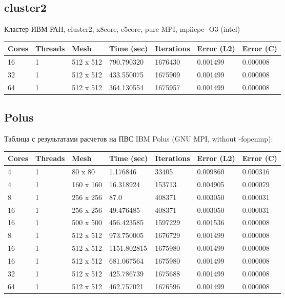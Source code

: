 \documentclass[12pt]{article}
\begin{document}
\subsection{cluster2}

Кластер ИВМ РАН, cluster2, x8core, e5core, pure MPI, mpiicpc -O3 (intel)
\begin{center}
\begin{tabular}{lllllll}
Cores & Threads & Mesh & Time (sec) & Iterations & Error (L2) & Error (C) \\
\hline
16 & 1 & 512 x 512 & 790.790320 & 1676430 & 0.001499 & 0.000008 \\
32 & 1 & 512 x 512 & 433.550075 & 1675909 & 0.001499 & 0.000008 \\
64 & 1 & 512 x 512 & 364.130554 & 1675957 & 0.001499 & 0.000008 \\
\hline
\hline
\end{tabular}
\end{center}

\subsection{Polus}

Таблица с результатами расчетов на ПВС IBM Polus (GNU MPI, without -fopenmp):
\begin{center}
\begin{tabular}{lllllll}
Cores & Threads & Mesh & Time (sec) & Iterations & Error (L2) & Error (C) \\
\hline
4 & 1 & 80 x 80 & 1.176846 & 33405 & 0.009860 & 0.000316 \\
4 & 1 & 160 x 160 & 16.318924 & 153713 & 0.004905 & 0.000079 \\
\hline
8 & 1 & 256 x 256 & 87.0 & 408371 & 0.003050 & 0.000031 \\
16 & 1 & 256 x 256 & 49.476485 & 408371 & 0.003050 & 0.000031 \\
\hline
16 & 1 & 500 x 500 & 456.423585 & 1597229 & 0.001536 & 0.000008 \\
\hline
8 & 1 & 512 x 512 & 973.750005 & 1676729 & 0.001499 & 0.000008  \\
16 & 1 & 512 x 512 & 1151.802815 & 1675980 & 0.001499 & 0.000008 \\
16 & 1 & 512 x 512 & 681.067564 & 1675980 & 0.001499 & 0.000008 \\
32 & 1 & 512 x 512 & 425.786739 & 1675688 & 0.001499 & 0.000008 \\
64 & 1 & 512 x 512 & 462.757021 & 1676596 & 0.001499 & 0.000008 \\
\hline
\end{tabular}
\end{center}
\end{document}
